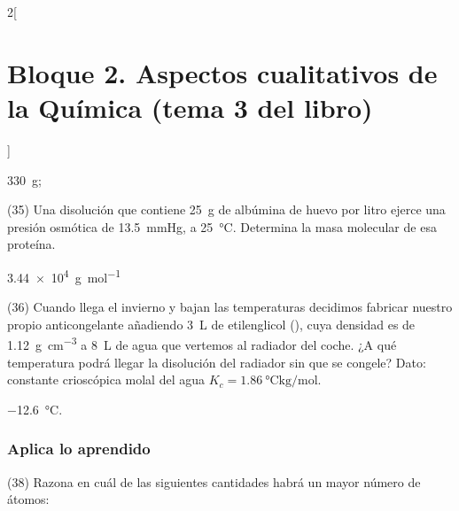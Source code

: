 \documentclass[10pt]{article}
\begin{document}
\begin{multicols}{2}[
    \section{Bloque 2. Aspectos cualitativos de la Química (tema 3 del libro)}
  ]
\begin{solution}
  \begin{enumerate*}
    \item \SI{330}{\gram};
    \item {}
  \end{enumerate*}
\end{solution}




\begin{exercise}[
    tags    = {},
    topics  = {química,química básica},
    source  = {FQ 1B MGH 2016, p85, e35},
  ]
  (35) Una disolución que contiene \SI{25}{\gram} de albúmina de
  huevo por litro ejerce una presión osmótica de \SI{13.5}{\mmHg}, a
  \SI{25}{\celsius}. Determina la masa molecular de esa proteína.
\end{exercise}

\begin{solution}
  \SI{3.44e4}{\gram\per\mole}
\end{solution}




\begin{exercise}[
    tags    = {},
    topics  = {química,química básica},
    source  = {FQ 1B MGH 2016, p85, e26},
  ]

  (36) Cuando llega el invierno y bajan las temperaturas decidimos
  fabricar nuestro propio anticongelante añadiendo \SI{3}{\liter} de
  etilenglicol (), cuya densidad es de \SI{1.12}{\gram\per\cubic\centi\meter} a \SI{8}{\liter}
  de agua que vertemos al radiador del coche. ¿A qué temperatura
  podrá llegar la disolución del radiador sin que se congele?
  Dato: constante crioscópica molal del agua \( K_c = \SI{1.86}{\celsius\kilo\gram\per\mole} \).
\end{exercise}

\begin{solution}
  \SI{-12.6}{\celsius}.
\end{solution}



\subsubsection{Aplica lo aprendido}




\begin{exercise}[
    tags    = {},
    topics  = {química,química básica},
    source  = {FQ 1B MGH 2016, p85, e26},
  ]

  (38) Razona en cuál de las siguientes cantidades habrá un mayor número de átomos:


\end{exercise}
\end{multicols}
\end{document}

